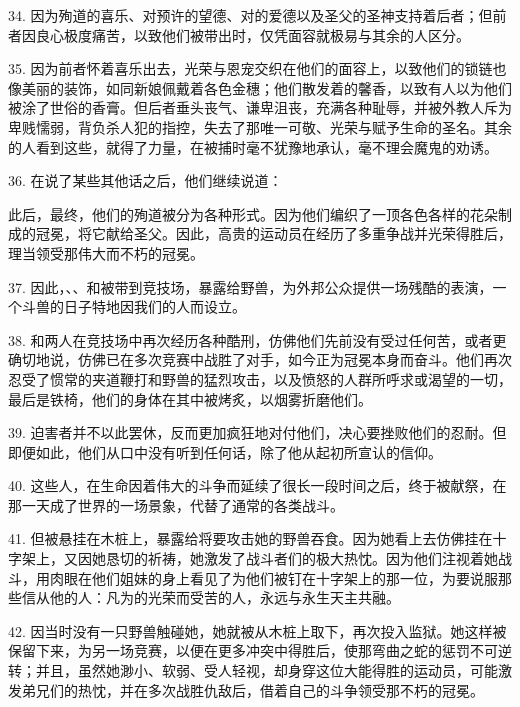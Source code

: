 34. 因为殉道的喜乐、对预许的望德、对的爱德以及圣父的圣神支持着后者；但前者因良心极度痛苦，以致他们被带出时，仅凭面容就极易与其余的人区分。\par

35. 因为前者怀着喜乐出去，光荣与恩宠交织在他们的面容上，以致他们的锁链也像美丽的装饰，如同新娘佩戴着各色金穗；他们散发着的馨香，以致有人以为他们被涂了世俗的香膏。但后者垂头丧气、谦卑沮丧，充满各种耻辱，并被外教人斥为卑贱懦弱，背负杀人犯的指控，失去了那唯一可敬、光荣与赋予生命的圣名。其余的人看到这些，就得了力量，在被捕时毫不犹豫地承认，毫不理会魔鬼的劝诱。\par

36. 在说了某些其他话之后，他们继续说道：\par

此后，最终，他们的殉道被分为各种形式。因为他们编织了一顶各色各样的花朵制成的冠冕，将它献给圣父。因此，高贵的运动员在经历了多重争战并光荣得胜后，理当领受那伟大而不朽的冠冕。\par

37. 因此，、、和被带到竞技场，暴露给野兽，为外邦公众提供一场残酷的表演，一个斗兽的日子特地因我们的人而设立。\par

38. 和两人在竞技场中再次经历各种酷刑，仿佛他们先前没有受过任何苦，或者更确切地说，仿佛已在多次竞赛中战胜了对手，如今正为冠冕本身而奋斗。他们再次忍受了惯常的夹道鞭打和野兽的猛烈攻击，以及愤怒的人群所呼求或渴望的一切，最后是铁椅，他们的身体在其中被烤炙，以烟雾折磨他们。\par

39. 迫害者并不以此罢休，反而更加疯狂地对付他们，决心要挫败他们的忍耐。但即便如此，他们从口中没有听到任何话，除了他从起初所宣认的信仰。\par

40. 这些人，在生命因着伟大的斗争而延续了很长一段时间之后，终于被献祭，在那一天成了世界的一场景象，代替了通常的各类战斗。\par

41. 但被悬挂在木桩上，暴露给将要攻击她的野兽吞食。因为她看上去仿佛挂在十字架上，又因她恳切的祈祷，她激发了战斗者们的极大热忱。因为他们注视着她战斗，用肉眼在他们姐妹的身上看见了为他们被钉在十字架上的那一位，为要说服那些信从他的人：凡为的光荣而受苦的人，永远与永生天主共融。\par

42. 因当时没有一只野兽触碰她，她就被从木桩上取下，再次投入监狱。她这样被保留下来，为另一场竞赛，以便在更多冲突中得胜后，使那弯曲之蛇的惩罚不可逆转；并且，虽然她渺小、软弱、受人轻视，却身穿这位大能得胜的运动员，可能激发弟兄们的热忱，并在多次战胜仇敌后，借着自己的斗争领受那不朽的冠冕。\par

